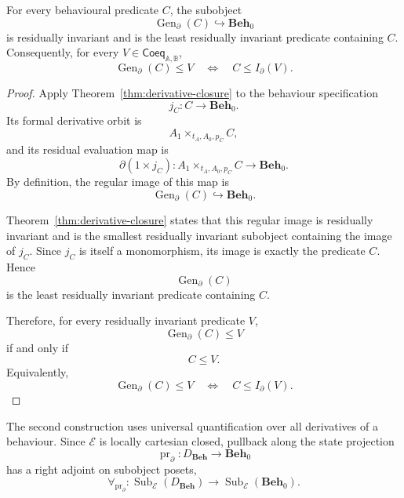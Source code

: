 \begin{proposition}
\label{prop:generated-residual-closure}
    For every behavioural predicate \(C\), the subobject
    \[
        \operatorname{Gen}_\partial(C)
        \hookrightarrow
        \mathbf{Beh}_0
    \]
    is residually invariant and is the least residually invariant predicate
    containing \(C\). Consequently, for every
    \(V\in\mathsf{Coeq}_{\mathbb A,\mathbb B}\),
    \[
        \operatorname{Gen}_\partial(C)\leq V
        \quad\Longleftrightarrow\quad
        C\leq I_\partial(V).
    \]
\end{proposition}
\begin{proof}
    Apply Theorem~\ref{thm:derivative-closure} to the behaviour specification
    \[
        j_C:C\to\mathbf{Beh}_0.
    \]
    Its formal derivative orbit is
    \[
        A_1\times_{t_A,A_0,p_C}C,
    \]
    and its residual evaluation map is
    \[
        \partial(1\times j_C):
        A_1\times_{t_A,A_0,p_C}C
        \to
        \mathbf{Beh}_0.
    \]
    By definition, the regular image of this map is
    \[
        \operatorname{Gen}_\partial(C)
        \hookrightarrow
        \mathbf{Beh}_0.
    \]

    Theorem~\ref{thm:derivative-closure} states that this regular image is
    residually invariant and is the smallest residually invariant subobject
    containing the image of \(j_C\). Since \(j_C\) is itself a monomorphism,
    its image is exactly the predicate \(C\). Hence
    \[
        \operatorname{Gen}_\partial(C)
    \]
    is the least residually invariant predicate containing \(C\).

    Therefore, for every residually invariant predicate \(V\),
    \[
        \operatorname{Gen}_\partial(C)\leq V
    \]
    if and only if
    \[
        C\leq V.
    \]
    Equivalently,
    \[
        \operatorname{Gen}_\partial(C)\leq V
        \quad\Longleftrightarrow\quad
        C\leq I_\partial(V).
    \]
\end{proof}

The second construction uses universal quantification over all derivatives of
a behaviour. Since \(\mathcal E\) is locally cartesian closed, pullback along
the state projection
\[
    \operatorname{pr}_{\partial}:
    D_{\mathbf{Beh}}\to\mathbf{Beh}_0
\]
has a right adjoint on subobject posets,
\[
    \forall_{\operatorname{pr}_{\partial}}:
    \operatorname{Sub}_{\mathcal E}(D_{\mathbf{Beh}})
    \to
    \operatorname{Sub}_{\mathcal E}(\mathbf{Beh}_0).
\]


